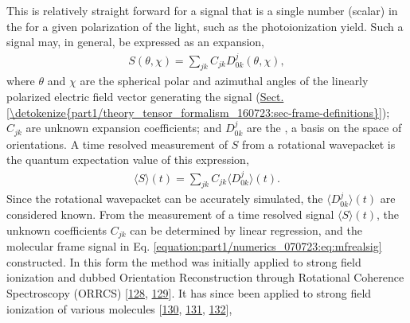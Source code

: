 \documentclass[letterpaper,table,10pt,english]{jupyterBook}
\begin{document}
\sphinxAtStartPar
This is relatively straight forward for a signal that is a single number (scalar) in the {\hyperref[\detokenize{backmatter/glossary:term-MF}]{}} for a given polarization of the light, such as the photoionization yield. Such a signal may, in general, be expressed as an expansion,
\begin{equation}\label{equation:part1/numerics_070723:eq:mfrealsig}
\begin{split}
S(\theta,\chi)=\sum_{jk}C_{jk}D^{j}_{0k}(\theta,\chi),
\end{split}
\end{equation}
\sphinxAtStartPar
where \(\theta\) and \(\chi\) are the {\hyperref[\detokenize{backmatter/glossary:term-MF}]{}} spherical polar and azimuthal angles of the linearly polarized electric field vector generating the signal (\hyperref[\detokenize{part1/theory_tensor_formalism_160723:sec-frame-definitions}]{Sect.\@ \ref{\detokenize{part1/theory_tensor_formalism_160723:sec-frame-definitions}}}); \(C_{jk}\) are unknown expansion coefficients; and \(D^{j}_{0k}\) are the {\hyperref[\detokenize{backmatter/glossary:term-Wigner-rotation-matrix-elements}]{}}, a basis on the space of orientations. A time resolved measurement of \(S\) from a rotational wavepacket is the quantum expectation value of this expression,
\begin{equation}\label{equation:part1/numerics_070723:eq:St-Cjk}
\begin{split}
\langle S \rangle(t) = \sum_{jk}C_{jk}\langle D^{j}_{0k} \rangle (t).
\end{split}
\end{equation}
\sphinxAtStartPar
Since the rotational wavepacket can be accurately simulated, the \(\langle D^{j}_{0k} \rangle (t)\) are considered known. From the measurement of a time resolved signal \(\langle S \rangle(t)\), the unknown coefficients \(C_{jk}\) can be determined by linear regression, and the molecular frame signal in Eq. \eqref{equation:part1/numerics_070723:eq:mfrealsig} constructed. In this form the method was initially applied to strong field ionization and dubbed Orientation Reconstruction through Rotational Coherence Spectroscopy (ORRCS) {[}\hyperlink{cite.backmatter/bibliography:id996}{128}, \hyperlink{cite.backmatter/bibliography:id995}{129}{]}.
It has since been applied to strong field ionization of various molecules {[}\hyperlink{cite.backmatter/bibliography:id997}{130}, \hyperlink{cite.backmatter/bibliography:id998}{131}, \hyperlink{cite.backmatter/bibliography:id1001}{132}{]},
\end{document}
